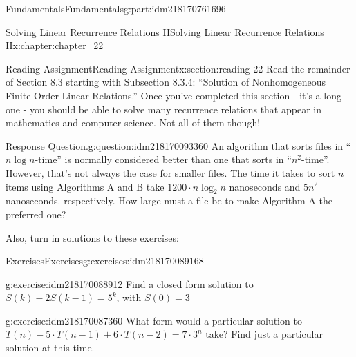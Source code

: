 \documentclass[oneside,10pt,]{book}
\numberwithin{equation}{section}
\begin{document}
\begin{partptx}{Fundamentals}{}{Fundamentals}{}{}{g:part:idm218170761696}
%
\typeout{************************************************}
\typeout{************************************************}
%
\begin{chapterptx}{Solving Linear Recurrence Relations II}{}{Solving Linear Recurrence Relations II}{}{}{x:chapter:chapter_22}
\index{}%
%
%
\typeout{************************************************}
\typeout{************************************************}
%
\begin{sectionptx}{Reading Assignment}{}{Reading Assignment}{}{}{x:section:reading-22}
Read the remainder of Section 8.3 starting with Subsection 8.3.4: ``Solution of Nonhomogeneous Finite Order Linear Relations.''  Once you've completed this section - it's a long one - you should be able to solve many recurrence relations that appear in mathematics and computer science.   Not all of them though!%
\begin{question}{Response Question.}{g:question:idm218170093360}%
An algorithm that sorts files in ``\(n \log{n}\)-time'' is normally considered better than one that sorts in ``\(n^2\)-time''.  However, that's not always the case for smaller files.  The time it takes to sort \(n\) items using Algorithms A and B take \(1200\cdot n \log_2{n}\) nanoseconds and \(5 n^2\) nanoseconds. respectively. How large must a file be to make Algorithm A the preferred one?%
\end{question}
Also, turn in solutions to these exercises:%
%
%
\typeout{************************************************}
\typeout{************************************************}
%
\begin{exercises-subsection-numberless}{Exercises}{}{Exercises}{}{}{g:exercises:idm218170089168}
\par\medskip\noindent%
%
\begin{exercisegroup}
\begin{divisionexerciseeg}{1}{}{}{g:exercise:idm218170088912}%
Find a closed form solution to \(S(k) - 2 S (k - 1) = 5^k\), with \(S(0) = 3\)%
\end{divisionexerciseeg}%
\begin{divisionexerciseeg}{2}{}{}{g:exercise:idm218170087360}%
What form would a particular solution to \(T(n)-5\cdot T(n-1)+6\cdot T(n-2)=7 \cdot 3^n\) take?  Find just a particular solution at this time.%
\end{divisionexerciseeg}%
\end{exercisegroup}

\end{exercises-subsection-numberless}
\end{sectionptx}
\end{chapterptx}
\end{partptx}
\end{document}
